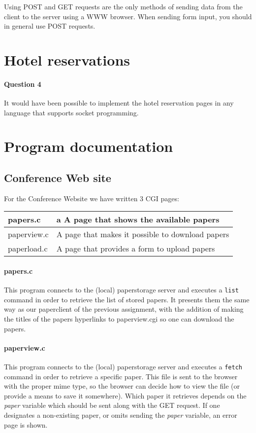 \documentclass[a4paper,10pt]{article}
\begin{document}
Using \textsc{POST} and \textsc{GET} requests are the only methods of sending data
from the client to the server using a WWW browser. When sending form input, you
should in general use \textsc{POST} requests.

\section{Hotel reservations}
\paragraph{Question 4}
It would have been possible to implement the hotel reservation pages in any language
that supports socket programming.

\section{Program documentation}
\subsection{Conference Web site}
For the Conference Website we have written 3 CGI pages:
\begin{center}
\begin{tabular}{ l | p{9cm} }
papers.c & a A page that shows the available papers\\ \hline
paperview.c & A page that makes it possible to download papers\\ \hline
paperload.c & A page that provides a form to upload papers\\
\end{tabular}
\end{center}

\paragraph{papers.c}
This program connects to the (local) paperstorage server and executes a \texttt{list}
command in order to retrieve the list of stored papers. It presents them the same way
as our paperclient of the previous assignment, with the addition of making the titles
of the papers hyperlinks to paperview.cgi so one can download the papers.

\paragraph{paperview.c}
This program connects to the (local) paperstorage server and executes a \texttt{fetch}
command in order to retrieve a specific paper. This file is sent to the browser with
the proper mime type, so the browser can decide how to view the file (or provide a
means to save it somewhere). Which paper it retrieves depends on the \textit{paper}
variable which should be sent along with the \textsc{GET} request. If one designates
a non-existing paper, or omits sending the \textit{paper} variable, an error page is
shown.
\end{document}
